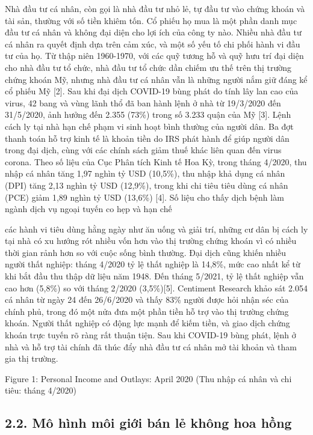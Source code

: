 Nhà đầu tư cá nhân, còn gọi là nhà đầu tư nhỏ lẻ, tự đầu tư vào chứng khoán và tài sản, thường với số tiền khiêm tốn. Cổ phiếu họ mua là một phần danh mục đầu tư cá nhân và không đại diện cho lợi ích của công ty nào. Nhiều nhà đầu tư cá nhân ra quyết định dựa trên cảm xúc, và một số yếu tố chi phối hành vi đầu tư của họ. Từ thập niên 1960-1970, với các quỹ tương hỗ và quỹ hưu trí đại diện cho nhà đầu tư tổ chức, nhà đầu tư tổ chức dần chiếm ưu thế trên thị trường chứng khoán Mỹ, nhưng nhà đầu tư cá nhân vẫn là những người nắm giữ đáng kể cổ phiếu Mỹ {[}2{]}. Sau khi đại dịch COVID-19 bùng phát do tính lây lan cao của virus, 42 bang và vùng lãnh thổ đã ban hành lệnh ở nhà từ 19/3/2020 đến 31/5/2020, ảnh hưởng đến 2.355 (73\%) trong số 3.233 quận của Mỹ {[}3{]}. Lệnh cách ly tại nhà hạn chế phạm vi sinh hoạt bình thường của người dân. Ba đợt thanh toán hỗ trợ kinh tế là khoản tiền do IRS phát hành để giúp người dân trong đại dịch, cùng với các chính sách giảm thuế khác liên quan đến virus corona. Theo số liệu của Cục Phân tích Kinh tế Hoa Kỳ, trong tháng 4/2020, thu nhập cá nhân tăng 1,97 nghìn tỷ USD (10,5\%), thu nhập khả dụng cá nhân (DPI) tăng 2,13 nghìn tỷ USD (12,9\%), trong khi chi tiêu tiêu dùng cá nhân (PCE) giảm 1,89 nghìn tỷ USD (13,6\%) {[}4{]}. Số liệu cho thấy dịch bệnh làm ngành dịch vụ ngoại tuyến co hẹp và hạn chế

các hành vi tiêu dùng hằng ngày như ăn uống và giải trí, những cư dân bị cách ly tại nhà có xu hướng rót nhiều vốn hơn vào thị trường chứng khoán vì có nhiều thời gian rảnh hơn so với cuộc sống bình thường. Đại dịch cũng khiến nhiều người thất nghiệp: tháng 4/2020 tỷ lệ thất nghiệp là 14,8\%, mức cao nhất kể từ khi bắt đầu thu thập dữ liệu năm 1948. Đến tháng 5/2021, tỷ lệ thất nghiệp vẫn cao hơn (5,8\%) so với tháng 2/2020 (3,5\%){[}5{]}. Centiment Research khảo sát 2.054 cá nhân từ ngày 24 đến 26/6/2020 và thấy 83\% người được hỏi nhận séc của chính phủ, trong đó một nửa đưa một phần tiền hỗ trợ vào thị trường chứng khoán. Người thất nghiệp có động lực mạnh để kiếm tiền, và giao dịch chứng khoán trực tuyến rõ ràng rất thuận tiện. Sau khi COVID-19 bùng phát, lệnh ở nhà và hỗ trợ tài chính đã thúc đẩy nhà đầu tư cá nhân mở tài khoản và tham gia thị trường.

Figure 1: Personal Income and Outlays: April 2020 (Thu nhập cá nhân và chi tiêu: tháng 4/2020)

\subsection{2.2. Mô hình môi giới bán lẻ không hoa hồng}

